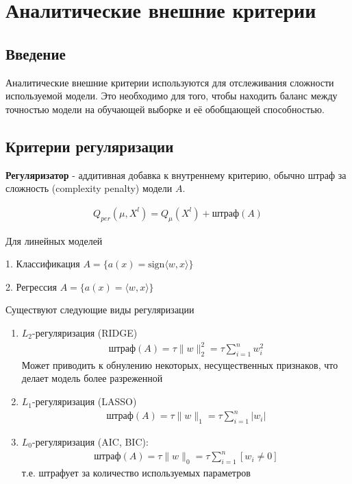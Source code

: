 \section*{Аналитические внешние критерии}

\subsection*{Введение}

\par Аналитические внешние критерии используются для отслеживания сложности используемой модели. Это необходимо для того, чтобы находить баланс между точностью модели на обучающей выборке и её обобщающей способностью.

\subsection*{Критерии регуляризации}

\par \textbf{Регуляризатор} - аддитивная добавка к внутреннему критерию, обычно штраф за сложность (complexity penalty) модели $A$. 

\begin{align*}
    Q_{per} (\mu, X^l) = Q_{\mu}(X^l) + \text{штраф}(A)
\end{align*}


\par Для линейных моделей

1. Классификация $A = \{a(x) = \text{sign}\langle w, x \rangle\}$

2. Регрессия $A = \{a(x) = \langle w, x \rangle \}$

\par Существуют следующие виды регуляризации

\begin{enumerate}
    \item $L_2$-регуляризация (RIDGE)
        \begin{align*}
            \text{штраф}(A) =  \tau \|w\|_2^2 = \tau \sum\limits_{i = 1}^n w_i^2
        \end{align*}
        Может приводить к обнулению некоторых, несущественных признаков, что делает модель более разреженной
    \item $L_1$-регуляризация (LASSO)
        \begin{align*}
            \text{штраф}(A) = \tau \|w\|_1 = \tau \sum\limits_{i = 1}^n |w_i|
        \end{align*}
    \item $L_0$-регуляризация (AIC, BIC):
        \begin{align*}
            \text{штраф}(A) = \tau\|w\|_0 = \tau\sum\limits_{i = 1}^n [w_i \neq 0]
        \end{align*}
        т.е. штрафует за количество используемых параметров
\end{enumerate}

